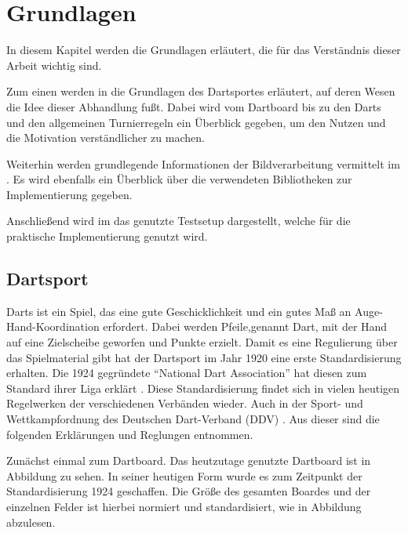 
\chapter{Grundlagen}
\label{chap:fundamentals}
In diesem Kapitel werden die Grundlagen erläutert, die für das Verständnis dieser Arbeit wichtig sind. 

Zum einen werden in  die Grundlagen des Dartsportes erläutert, auf deren Wesen die Idee dieser Abhandlung fußt. Dabei wird vom Dartboard bis zu den Darts und den allgemeinen Turnierregeln ein Überblick gegeben, um den Nutzen und die Motivation verständlicher zu machen.

Weiterhin werden grundlegende Informationen der Bildverarbeitung vermittelt im . Es wird ebenfalls ein Überblick über die verwendeten Bibliotheken zur Implementierung gegeben.

Anschließend wird im  das genutzte Testsetup dargestellt, welche für die praktische Implementierung genutzt wird.
\section{Dartsport}
\label{sec:darts}
Darts ist ein Spiel, das eine gute Geschicklichkeit und ein gutes Maß an Auge-Hand-Koordination erfordert. Dabei werden Pfeile,genannt Dart, mit der Hand auf eine Zielscheibe geworfen und Punkte erzielt. Damit es eine Regulierung über das Spielmaterial gibt hat der Dartsport im Jahr 1920 eine erste Standardisierung erhalten. Die 1924 gegründete "`National Dart Association"' hat diesen zum Standard ihrer Liga erklärt \autocite[5]{guide2013}. Diese Standardisierung findet sich in vielen heutigen Regelwerken der verschiedenen Verbänden wieder. Auch in der Sport- und Wettkampfordnung des Deutschen
Dart-Verband (DDV) \autocite{DartsRegel2016}. Aus dieser sind die folgenden Erklärungen und Reglungen entnommen. 

Zunächst einmal zum Dartboard. Das heutzutage genutzte Dartboard ist in Abbildung zu sehen. In seiner heutigen Form wurde es zum Zeitpunkt der Standardisierung 1924 geschaffen. Die Größe des gesamten Boardes und der einzelnen Felder ist hierbei normiert und standardisiert, wie in Abbildung  abzulesen. 

